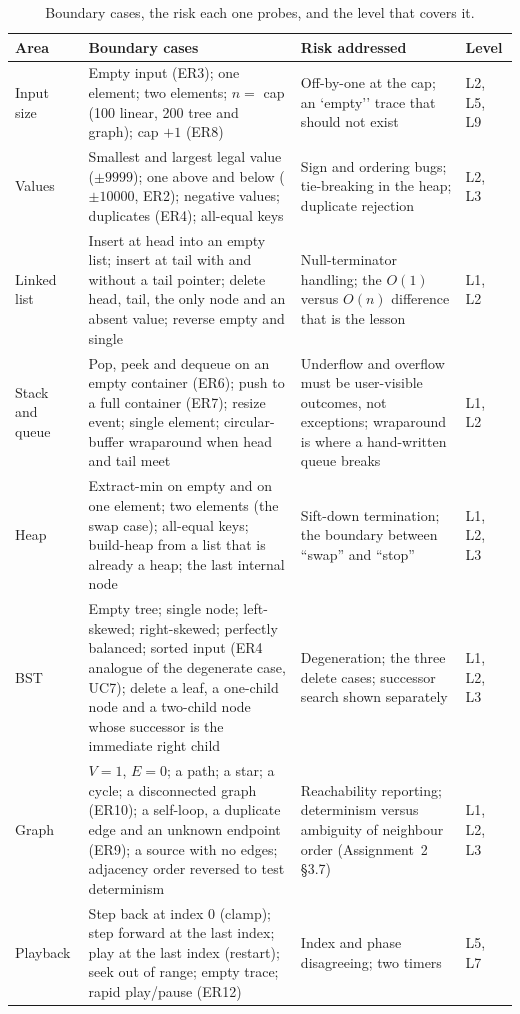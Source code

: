 \documentclass[11pt,a4paper]{article}
\begin{document}
\begin{table}[H]
\centering
\small
\setlength{\tabcolsep}{4pt}
\begin{tabular}{@{}L{2.1cm}L{6.6cm}L{2.4cm}L{3.1cm}@{}}
\toprule
\textbf{Area} & \textbf{Boundary cases} & \textbf{Risk addressed} & \textbf{Level} \\
\midrule
Input size & Empty input (ER3); one element; two elements; $n = $ cap (100 linear, 200 tree
and graph); cap $+1$ (ER8) & Off-by-one at the cap; an `empty'' trace that should not exist &
L2, L5, L9 \\
Values & Smallest and largest legal value ($\pm 9999$); one above and below ($\pm 10000$,
ER2); negative values; duplicates (ER4); all-equal keys & Sign and ordering bugs; tie-breaking
in the heap; duplicate rejection & L2, L3 \\
Linked list & Insert at head into an empty list; insert at tail with and without a tail
pointer; delete head, tail, the only node and an absent value; reverse empty and single &
Null-terminator handling; the $O(1)$ versus $O(n)$ difference that is the lesson & L1, L2 \\
Stack and queue & Pop, peek and dequeue on an empty container (ER6); push to a full container
(ER7); resize event; single element; circular-buffer wraparound when head and tail meet &
Underflow and overflow must be user-visible outcomes, not exceptions; wraparound is where a
hand-written queue breaks & L1, L2 \\
Heap & Extract-min on empty and on one element; two elements (the swap case); all-equal keys;
build-heap from a list that is already a heap; the last internal node & Sift-down termination;
the boundary between ``swap'' and ``stop'' & L1, L2, L3 \\
BST & Empty tree; single node; left-skewed; right-skewed; perfectly balanced; sorted input
(ER4 analogue of the degenerate case, UC7); delete a leaf, a one-child node and a two-child
node whose successor is the immediate right child & Degeneration; the three delete cases;
successor search shown separately & L1, L2, L3 \\
Graph & $V = 1$, $E = 0$; a path; a star; a cycle; a disconnected graph (ER10); a self-loop,
a duplicate edge and an unknown endpoint (ER9); a source with no edges; adjacency order
reversed to test determinism & Reachability reporting; determinism versus ambiguity of
neighbour order (Assignment~2 \S3.7) & L1, L2, L3 \\
Playback & Step back at index $0$ (clamp); step forward at the last index; play at the last
index (restart); seek out of range; empty trace; rapid play/pause (ER12) & Index and phase
disagreeing; two timers & L5, L7 \\
\bottomrule
\end{tabular}
\caption{Boundary cases, the risk each one probes, and the level that covers it.}
\label{tab:boundary}
\end{table}
\end{document}
